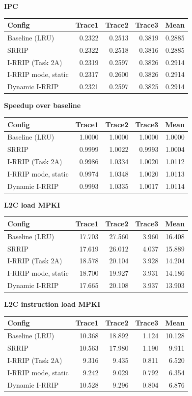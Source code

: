 \textbf{IPC}\\[2pt]
\begin{tabular}{lrrrr}\toprule
Config & Trace1 & Trace2 & Trace3 & Mean \\ \midrule
Baseline (LRU) & 0.2322 & 0.2513 & 0.3819 & 0.2885 \\
SRRIP & 0.2322 & 0.2518 & 0.3816 & 0.2885 \\
I-RRIP (Task 2A) & 0.2319 & 0.2597 & 0.3826 & 0.2914 \\
I-RRIP mode, static & 0.2317 & 0.2600 & 0.3826 & 0.2914 \\
Dynamic I-RRIP & 0.2321 & 0.2597 & 0.3825 & 0.2914 \\
\bottomrule\end{tabular}
\medskip

\textbf{Speedup over baseline}\\[2pt]
\begin{tabular}{lrrrr}\toprule
Config & Trace1 & Trace2 & Trace3 & Mean \\ \midrule
Baseline (LRU) & 1.0000 & 1.0000 & 1.0000 & 1.0000 \\
SRRIP & 0.9999 & 1.0022 & 0.9993 & 1.0004 \\
I-RRIP (Task 2A) & 0.9986 & 1.0334 & 1.0020 & 1.0112 \\
I-RRIP mode, static & 0.9974 & 1.0348 & 1.0020 & 1.0113 \\
Dynamic I-RRIP & 0.9993 & 1.0335 & 1.0017 & 1.0114 \\
\bottomrule\end{tabular}
\medskip

\textbf{L2C load MPKI}\\[2pt]
\begin{tabular}{lrrrr}\toprule
Config & Trace1 & Trace2 & Trace3 & Mean \\ \midrule
Baseline (LRU) & 17.703 & 27.560 & 3.960 & 16.408 \\
SRRIP & 17.619 & 26.012 & 4.037 & 15.889 \\
I-RRIP (Task 2A) & 18.578 & 20.104 & 3.928 & 14.204 \\
I-RRIP mode, static & 18.700 & 19.927 & 3.931 & 14.186 \\
Dynamic I-RRIP & 17.665 & 20.108 & 3.937 & 13.903 \\
\bottomrule\end{tabular}
\medskip

\textbf{L2C instruction load MPKI}\\[2pt]
\begin{tabular}{lrrrr}\toprule
Config & Trace1 & Trace2 & Trace3 & Mean \\ \midrule
Baseline (LRU) & 10.368 & 18.892 & 1.124 & 10.128 \\
SRRIP & 10.563 & 17.980 & 1.190 & 9.911 \\
I-RRIP (Task 2A) & 9.316 & 9.435 & 0.811 & 6.520 \\
I-RRIP mode, static & 9.242 & 9.029 & 0.792 & 6.354 \\
Dynamic I-RRIP & 10.528 & 9.296 & 0.804 & 6.876 \\
\bottomrule\end{tabular}
\medskip

